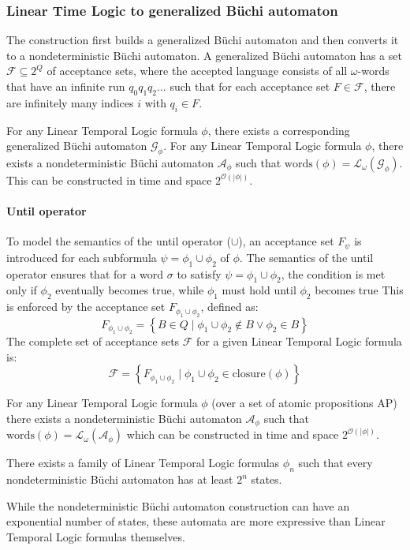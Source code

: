 \subsubsection{Linear Time Logic to generalized Büchi automaton}
The construction first builds a generalized Büchi automaton and then converts it to a nondeterministic Büchi automaton. 
A generalized Büchi automaton has a set $\mathcal{F}\subseteq 2^Q$ of acceptance sets, where the accepted language consists of all $\omega$-words that have an infinite run $q_0q_1q_2\dots$ such that for each acceptance set $F \in \mathcal{F}$, there are infinitely many indices $i$ with $q_i\in F$.

For any Linear Temporal Logic formula $\phi$, there exists a corresponding generalized Büchi automaton $\mathcal{G}_{\phi}$. 
For any Linear Temporal Logic formula $\phi$, there exists a nondeterministic Büchi automaton $\mathcal{A}_\phi$ such that $\text{words}(\phi)=\mathcal{L}_{\omega}(\mathcal{G}_{\phi})$. 
This can be constructed in time and space $2^{\mathcal{O}(\left\lvert \phi\right\rvert )}$.

\paragraph*{Until operator}
To model the semantics of the until operator ($\cup$), an acceptance set $F_\psi$  is introduced for each subformula $\psi = \phi_1 \cup \phi_2$ of $\phi$.
The semantics of the until operator ensures that for a word $\sigma$ to satisfy $\psi = \phi_1 \cup \phi_2$, the condition is met only if $\phi_2$ eventually becomes true, while $\phi_1$ must hold until $\phi_2$ becomes true
This is enforced by the acceptance set $F_{\phi_1\cup\phi_2}$, defined as: 
\[F_{\phi_1\cup\phi_2}=\left\{B \in Q\mid\phi_1\cup\phi_2\notin B \lor \phi_2\in B\right\}\]
\noindent The complete set of acceptance sets $\mathcal{F}$ for a given Linear Temporal Logic formula is:
\[\mathcal{F}=\left\{F_{\phi_1\cup\phi_2}\mid\phi_1\cup\phi_2\in\text{closure}(\phi)\right\}\]

\begin{theorem}
    For any Linear Temporal Logic formula $\phi$ (over a set of atomic propositions $\text{AP}$) there exists a nondeterministic Büchi automaton $\mathcal{A}_\phi$ such that $\text{words}(\phi)=\mathcal{L}_{\omega}(\mathcal{A}_\phi)$ which can be constructed in time and space $2^{\mathcal{O}(\left\lvert \phi\right\rvert )}$.
\end{theorem}
\begin{theorem}
    There exists a family of Linear Temporal Logic formulas $\phi_n$ such that every nondeterministic Büchi automaton has at least $2^n$ states. 
\end{theorem}
\noindent While the nondeterministic Büchi automaton construction can have an exponential number of states, these automata are more expressive than Linear Temporal Logic formulas themselves.

